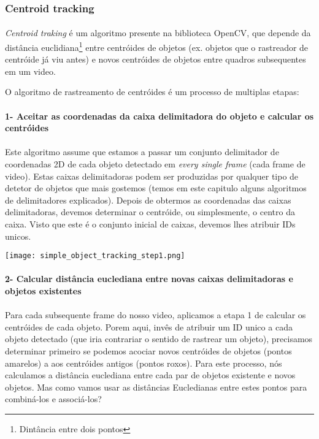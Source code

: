 \subsubsection{Centroid tracking}

\paragraph{}
\textit{Centroid traking} é um algoritmo presente na biblioteca OpenCV, que depende da distância euclidiana\footnote{Dintância entre dois pontos} entre centróides de objetos (ex. objetos que o rastreador de centróide já viu antes) e novos centróides de objetos entre quadros subsequentes em um video.

O algoritmo de rastreamento de centróides é um processo de multiplas etapas:

\paragraph{1- Aceitar as coordenadas da caixa delimitadora do objeto e calcular os centróides}
\paragraph{}
Este algoritmo assume que estamos a passar um conjunto delimitador de coordenadas 2D de cada objeto detectado em \textit{every single frame} (cada frame de video).
\newline
Estas caixas delimitadoras podem ser produzidas por qualquer tipo de detetor de objetos que mais gostemos (temos em este capitulo alguns algoritmos de delimitadores explicados).
\newline
Depois de obtermos as coordenadas das caixas delimitadoras, devemos determinar o centróide, ou simplesmente, o centro da caixa.
\newline
Visto que este é o conjunto inicial de caixas, devemos lhes atribuir IDs unicos.
\begin{center}
  \texttt{[image: simple\_object\_tracking\_step1.png]}
  \label{img:centroid_traking1}  
\end{center}

\paragraph{2- Calcular distância euclediana entre novas caixas delimitadoras e objetos existentes}
\paragraph{}
Para cada subsequente frame do nosso video, aplicamos a etapa 1 de calcular os centróides de cada objeto. Porem aqui, invês de atribuir um ID unico a cada objeto detectado (que iria contrariar o sentido de rastrear um objeto), precisamos determinar primeiro se podemos acociar novos centróides de objetos (pontos amarelos) a aos centróides antigos (pontos roxos). Para este processo, nós calculamos a distância euclediana entre cada par de objetos existente e novos objetos.
\newline
Mas como vamos usar as distâncias Eucledianas entre estes pontos para combiná-los e associá-los? 

